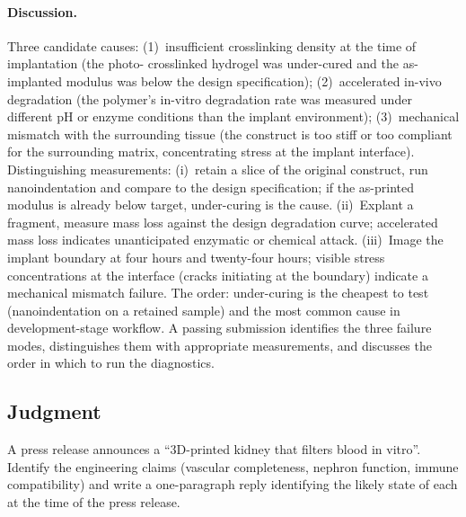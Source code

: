 \paragraph{Discussion.} Three candidate causes: (1)~insufficient
crosslinking density at the time of implantation (the photo-
crosslinked hydrogel was under-cured and the as-implanted modulus
was below the design specification); (2)~accelerated in-vivo
degradation (the polymer's in-vitro degradation rate was measured
under different pH or enzyme conditions than the implant
environment); (3)~mechanical mismatch with the surrounding tissue
(the construct is too stiff or too compliant for the surrounding
matrix, concentrating stress at the implant interface). Distinguishing
measurements: (i)~retain a slice of the original construct, run
nanoindentation and compare to the design specification; if the
as-printed modulus is already below target, under-curing is the
cause. (ii)~Explant a fragment, measure mass loss against the
design degradation curve; accelerated mass loss indicates
unanticipated enzymatic or chemical attack. (iii)~Image the
implant boundary at four hours and twenty-four hours; visible
stress concentrations at the interface (cracks initiating at the
boundary) indicate a mechanical mismatch failure. The order:
under-curing is the cheapest to test (nanoindentation on a retained
sample) and the most common cause in development-stage workflow.
A passing submission identifies the three failure modes,
distinguishes them with appropriate measurements, and discusses
the order in which to run the diagnostics.

\subsection*{Judgment}

\begin{exercise}
A press release announces a ``3D-printed kidney that filters blood
in vitro''. Identify the engineering claims (vascular completeness,
nephron function, immune compatibility) and write a one-paragraph
reply identifying the likely state of each at the time of the
press release.
\end{exercise}

